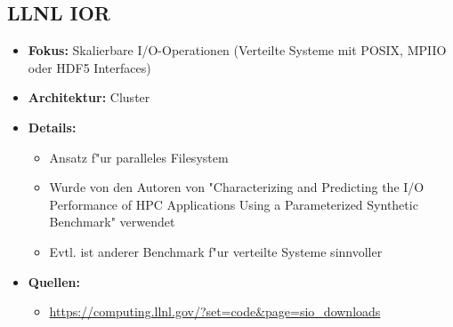 \documentclass{scrartcl}
\begin{document}
\subsection{LLNL IOR}
\begin{itemize}
	\item \textbf{Fokus:} Skalierbare I/O-Operationen (Verteilte Systeme mit POSIX, MPIIO oder HDF5 Interfaces)
	\item \textbf{Architektur:} Cluster
	\item \textbf{Details:} 
	\begin{itemize}
		\item Ansatz f"ur paralleles Filesystem
		\item Wurde von den Autoren von "Characterizing and Predicting the I/O Performance of HPC Applications Using a Parameterized Synthetic Benchmark" verwendet
		\item Evtl. ist anderer Benchmark f"ur verteilte Systeme sinnvoller 
	\end{itemize}	 
	\item \textbf{Quellen:} 
	\begin{itemize}
		\item \uline{https://computing.llnl.gov/?set=code\&page=sio\_downloads}
	\end{itemize}	
\end{itemize} 
\end{document}
